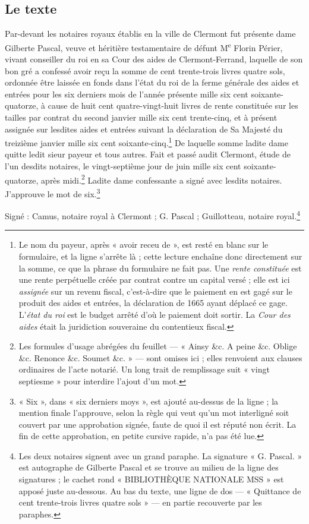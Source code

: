 \documentclass[11pt,a4paper]{article}
\begin{document}
\subsection*{Le texte}

Par-devant les notaires royaux établis en la ville de Clermont fut présente
dame Gilberte Pascal, veuve et héritière testamentaire de défunt
M\textsuperscript{e} Florin Périer, vivant conseiller du roi en sa Cour des
aides de Clermont-Ferrand, laquelle de son bon gré a confessé avoir reçu
la somme de cent trente-trois livres quatre sols, ordonnée être laissée en
fonds dans l'état du roi de la ferme générale des aides et entrées pour les
six derniers mois de l'année présente mille six cent soixante-quatorze, à
cause de huit cent quatre-vingt-huit livres de rente constituée sur les
tailles par contrat du second janvier mille six cent trente-cinq, et à présent
assignée sur lesdites aides et entrées suivant la déclaration de Sa Majesté du
treizième janvier mille six cent soixante-cinq.\footnote{Le nom du payeur,
après « avoir receu de », est resté en blanc sur le formulaire, et la ligne
s'arrête là ; cette lecture enchaîne donc directement sur la somme, ce que la
phrase du formulaire ne fait pas. Une \emph{rente constituée} est une rente
perpétuelle créée par contrat contre un capital versé ; elle est ici
\emph{assignée} sur un revenu fiscal, c'est-à-dire que le paiement en est
gagé sur le produit des aides et entrées, la déclaration de 1665 ayant déplacé
ce gage. L'\emph{état du roi} est le budget arrêté d'où le paiement doit
sortir. La \emph{Cour des aides} était la juridiction souveraine du contentieux
fiscal.} De laquelle somme ladite dame quitte ledit sieur payeur et tous
autres. Fait et passé audit Clermont, étude de l'un desdits notaires, le
vingt-septième jour de juin mille six cent soixante-quatorze, après
midi.\footnote{Les formules d'usage abrégées du feuillet — « Ainsy \&c. A
peine \&c. Oblige \&c. Renonce \&c. Soumet \&c. » — sont omises ici ; elles
renvoient aux clauses ordinaires de l'acte notarié. Un long trait de
remplissage suit « vingt septiesme » pour interdire l'ajout d'un mot.} Ladite
dame confessante a signé avec lesdits notaires. J'approuve le mot de
six.\footnote{« Six », dans « six derniers moys », est ajouté au-dessus de la
ligne ; la mention finale l'approuve, selon la règle qui veut qu'un mot
interligné soit couvert par une approbation signée, faute de quoi il est
réputé non écrit. La fin de cette approbation, en petite cursive rapide, n'a
pas été lue.}

Signé : Camus, notaire royal à Clermont ; G. Pascal ; Guillotteau, notaire
royal.\footnote{Les deux notaires signent avec un grand paraphe. La signature
« G. Pascal. » est autographe de Gilberte Pascal et se trouve au milieu de la
ligne des signatures ; le cachet rond « BIBLIOTHÈQUE NATIONALE MSS » est
apposé juste au-dessous. Au bas du texte, une ligne de dos — « Quittance de
cent trente-trois livres quatre sols » — en partie recouverte par les
paraphes.}
\end{document}
